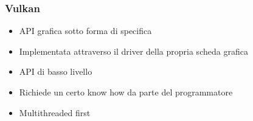 \begin{frame}
\frametitle{Vulkan}

\begin{itemize}
\item API grafica sotto forma di specifica
\item Implementata attraverso il driver della propria scheda grafica
\item API di basso livello
\item Richiede un certo know how da parte del programmatore
\item Multithreaded first
\end{itemize}

\end{frame}
